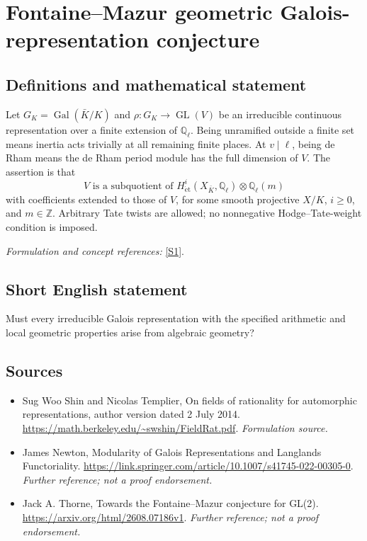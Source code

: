 \documentclass[11pt]{article}
\begin{document}
\section*{\texorpdfstring{Fontaine–Mazur geometric Galois-representation conjecture}{Fontaine–Mazur geometric Galois-representation conjecture}}\label{9400048}
\subsection{Definitions and mathematical statement}
Let $G_K=\operatorname{Gal}(\bar K/K)$ and $\rho:G_K\to\operatorname{GL}(V)$ be an irreducible continuous representation over a finite extension of ${\mathbb{Q}}_\ell$. Being unramified outside a finite set means inertia acts trivially at all remaining finite places. At $v\mid\ell$, being de Rham means the de Rham period module has the full dimension of $V$. The assertion is that
\[
 V\text{ is a subquotient of }H^i_{\mathrm{\acute et}}(X_{\bar K},{\mathbb{Q}}_\ell)\otimes{\mathbb{Q}}_\ell(m)
\]
with coefficients extended to those of $V$, for some smooth projective $X/K$, $i\ge0$, and $m\in{\mathbb{Z}}$. Arbitrary Tate twists are allowed; no nonnegative Hodge--Tate-weight condition is imposed.
\par\smallskip\textit{Formulation and concept references:} \href{https://math.berkeley.edu/~swshin/FieldRat.pdf}{[S1]}.

\subsection{Short English statement}
Must every irreducible Galois representation with the specified arithmetic and local geometric properties arise from algebraic geometry?
\subsection{Sources}
\begin{itemize}
\item[S1]Sug Woo Shin and Nicolas Templier, On fields of rationality for automorphic representations, author version dated 2 July 2014.
\url{https://math.berkeley.edu/~swshin/FieldRat.pdf}.
\textit{Formulation source.}
\item[S2]James Newton, Modularity of Galois Representations and Langlands Functoriality.
\url{https://link.springer.com/article/10.1007/s41745-022-00305-0}.
\textit{Further reference; not a proof endorsement.}
\item[S3]Jack A. Thorne, Towards the Fontaine–Mazur conjecture for GL(2).
\url{https://arxiv.org/html/2608.07186v1}.
\textit{Further reference; not a proof endorsement.}
\end{itemize}
\end{document}
